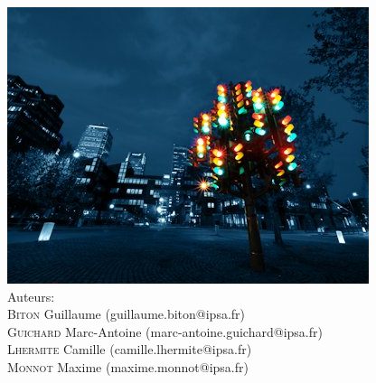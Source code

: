 \begin{titlepage}
 \includegraphics[scale=0.45]{Graphics/illustration.jpg}\\[2.5cm]

{\normalsize Auteurs:}\\
\small
\textsc{Biton} Guillaume (guillaume.biton@ipsa.fr)\\
\textsc{Guichard} Marc-Antoine \small(marc-antoine.guichard@ipsa.fr)\\
\textsc{Lhermite} Camille \small(camille.lhermite@ipsa.fr)\\
\textsc{Monnot} Maxime \small(maxime.monnot@ipsa.fr)\\[1cm]

 

\vfill %

\restoregeometry

\end{titlepage}